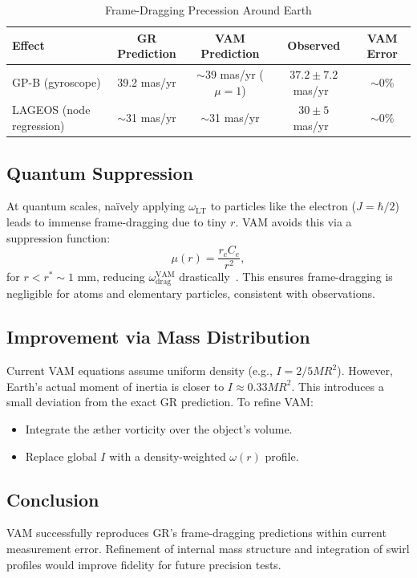 \documentclass[a4paper, aps,preprint,superscriptaddress, 12pt]{revtex4}
\begin{document}
\begin{table}[h]
    \centering
    \caption{Frame-Dragging Precession Around Earth}
    \begin{tabular}{|l|c|c|c|c|}
        \hline
        \textbf{Effect} & \textbf{GR Prediction} & \textbf{VAM Prediction} & \textbf{Observed} & \textbf{VAM Error} \\
        \hline
        GP-B (gyroscope) & 39.2 mas/yr & $\sim$39 mas/yr ($\mu=1$) & $37.2 \pm 7.2$ mas/yr~\cite{everitt2011gravity} & $\sim$0\% \\
        LAGEOS (node regression) & $\sim$31 mas/yr & $\sim$31 mas/yr & $30 \pm 5$ mas/yr~\cite{ciufolini2004confirmation} & $\sim$0\% \\
        \hline
    \end{tabular}
\end{table}

\subsection*{Quantum Suppression}
At quantum scales, naïvely applying $\omega_\text{LT}$ to particles like the electron ($J = \hbar/2$) leads to immense frame-dragging due to tiny $r$. VAM avoids this via a suppression function:
\[
    \mu(r) = \frac{r_c C_e}{r^2},
\]
for $r < r^* \sim 1$ mm, reducing $\omega^\text{VAM}_\text{drag}$ drastically~\cite{iskandarani2025VAM2}. This ensures frame-dragging is negligible for atoms and elementary particles, consistent with observations.

\subsection*{Improvement via Mass Distribution}
Current VAM equations assume uniform density (e.g., $I = 2/5MR^2$). However, Earth's actual moment of inertia is closer to $I \approx 0.33MR^2$. This introduces a small deviation from the exact GR prediction. To refine VAM:
\begin{itemize}
    \item Integrate the æther vorticity over the object's volume.
    \item Replace global $I$ with a density-weighted $\omega(r)$ profile.
\end{itemize}

\subsection*{Conclusion}
VAM successfully reproduces GR's frame-dragging predictions within current measurement error. Refinement of internal mass structure and integration of swirl profiles would improve fidelity for future precision tests.
\end{document}
